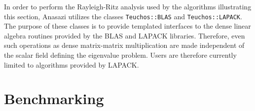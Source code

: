 \documentclass[acmtoms]{acmtrans2m}
\newcounter{algorithm}
\newcommand{\aspace}[1]{\texttt{#1}}
\begin{document}
In order to perform the Rayleigh-Ritz analysis used by the
algorithms illustrating this section, Anasazi utilizes the classes
\aspace{Teuchos::BLAS} and \aspace{Teuchos::LAPACK}. The purpose of
these classes is to provide templated interfaces to the dense linear
algebra routines provided by the BLAS and LAPACK libraries.
Therefore, even such operations as dense matrix-matrix
multiplication are made independent of the scalar field defining the
eigenvalue problem. Users are therefore currently limited to
algorithms provided by LAPACK.

\section{Benchmarking}
\label{sec:benchmarking}
\end{document}
